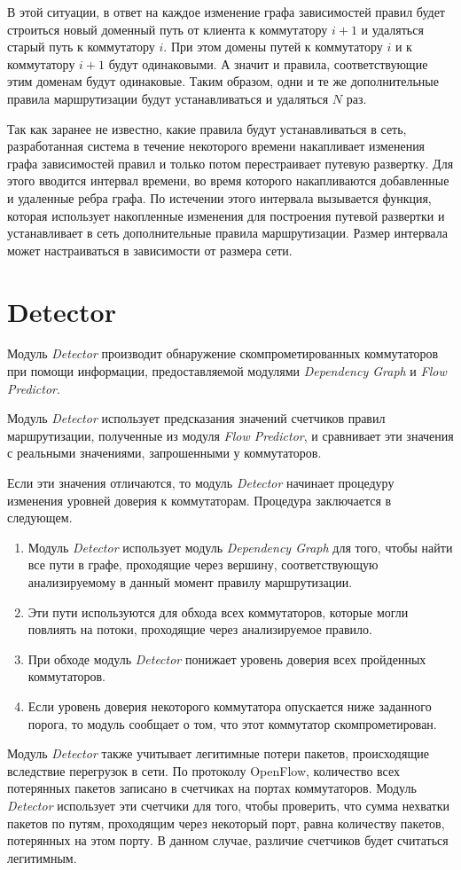 \documentclass[../thesis.tex]{subfiles}
\begin{document}
В этой ситуации, в ответ на каждое изменение графа зависимостей правил будет строиться новый доменный путь от клиента к коммутатору $i+1$ и удаляться старый путь к коммутатору $i$.
При этом домены путей к коммутатору $i$ и к коммутатору $i+1$ будут одинаковыми.
А значит и правила, соответствующие этим доменам будут одинаковые.
Таким образом, одни и те же дополнительные правила маршрутизации будут устанавливаться и удаляться $N$ раз.

Так как заранее не известно, какие правила будут устанавливаться в сеть, разработанная система в течение некоторого времени накапливает изменения графа зависимостей правил и только потом перестраивает путевую развертку.
Для этого вводится интервал времени, во время которого накапливаются добавленные и удаленные ребра графа.
По истечении этого интервала вызывается функция, которая использует накопленные изменения для построения путевой развертки и устанавливает в сеть дополнительные правила маршрутизации.
Размер интервала может настраиваться в зависимости от размера сети.

\section{Detector}

Модуль \textit{Detector} производит обнаружение скомпрометированных коммутаторов при помощи информации, предоставляемой модулями \textit{Dependency Graph} и \textit{Flow Predictor}.

Модуль \textit{Detector} использует предсказания значений счетчиков правил маршрутизации, полученные из модуля \textit{Flow Predictor}, и сравнивает эти значения с реальными значениями, запрошенными у коммутаторов.

Если эти значения отличаются, то модуль \textit{Detector} начинает процедуру изменения уровней доверия к коммутаторам.
Процедура заключается в следующем.
\begin{enumerate}
\item Модуль \textit{Detector} использует модуль \textit{Dependency Graph} для того, чтобы найти все пути в графе, проходящие через вершину, соответствующую анализируемому в данный момент правилу маршрутизации.
\item Эти пути используются для обхода всех коммутаторов, которые могли повлиять на потоки, проходящие через анализируемое правило.
\item При обходе модуль \textit{Detector} понижает уровень доверия всех пройденных коммутаторов.
\item Если уровень доверия некоторого коммутатора опускается ниже заданного порога, то модуль сообщает о том, что этот коммутатор скомпрометирован.
\end{enumerate}

Модуль \textit{Detector} также учитывает легитимные потери пакетов, происходящие вследствие перегрузок в сети.
По протоколу OpenFlow, количество всех потерянных пакетов записано в счетчиках на портах коммутаторов.
Модуль \textit{Detector} использует эти счетчики для того, чтобы проверить, что сумма нехватки пакетов по путям, проходящим через некоторый порт, равна количеству пакетов, потерянных на этом порту.
В данном случае, различие счетчиков будет считаться легитимным.
\end{document}
